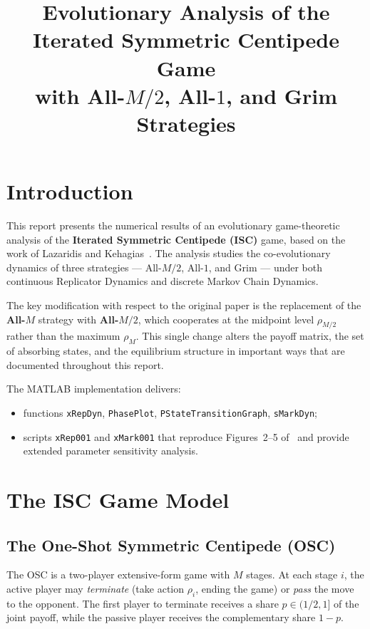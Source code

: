 \documentclass[12pt,a4paper]{article}
\title{\textbf{Evolutionary Analysis of the Iterated Symmetric Centipede Game}\\[0.5em]
\large with All-$M/2$, All-$1$, and Grim Strategies}
\author{}
\date{}
\begin{document}
\maketitle
\tableofcontents
\newpage

\section{Introduction}

This report presents the numerical results of an evolutionary game-theoretic
analysis of the \textbf{Iterated Symmetric Centipede (ISC)} game, based on the
work of Lazaridis and Kehagias~\cite{LK2026}. The analysis studies the
co-evolutionary dynamics of three strategies --- All-$M/2$, All-$1$, and Grim
--- under both continuous Replicator Dynamics and discrete Markov Chain
Dynamics.

The key modification with respect to the original paper is the replacement of
the \textbf{All-$M$} strategy with \textbf{All-$M/2$}, which cooperates at the
midpoint level $\rho_{M/2}$ rather than the maximum $\rho_M$. This single
change alters the payoff matrix, the set of absorbing states, and the
equilibrium structure in important ways that are documented throughout this
report.

The MATLAB implementation delivers:
\begin{itemize}
  \item functions \texttt{xRepDyn}, \texttt{PhasePlot}, \texttt{PStateTransitionGraph}, \texttt{sMarkDyn};
  \item scripts \texttt{xRep001} and \texttt{xMark001} that reproduce
        Figures~2--5 of~\cite{LK2026} and provide extended parameter
        sensitivity analysis.
\end{itemize}

\section{The ISC Game Model}

\subsection{The One-Shot Symmetric Centipede (OSC)}

The OSC is a two-player extensive-form game with $M$ stages. At each stage
$i$, the active player may \emph{terminate} (take action $\rho_i$, ending the
game) or \emph{pass} the move to the opponent. The first player to terminate
receives a share $p \in (1/2, 1]$ of the joint payoff, while the passive player
receives the complementary share $1-p$.
\end{document}
